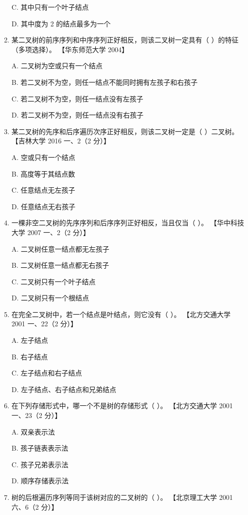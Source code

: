 \documentclass[lang=cn,newtx,10pt,scheme=chinese]{../../elegantbook}
\begin{document}
\begin{enumerate}
    C. 其中只有一个叶子结点  

    D. 其中度为 2 的结点最多为一个  

    \item 某二叉树的前序序列和中序序列正好相反，则该二叉树一定具有（ ）的特征（多项选择）。  
    【华东师范大学 2004】  

    A. 二叉树为空或只有一个结点  

    B. 若二叉树不为空，则任一结点不能同时拥有左孩子和右孩子 

    C. 若二叉树不为空，则任一结点没有左孩子 

    D. 若二叉树不为空，则任一结点没有右孩子  

    \item 某二叉树的先序和后序遍历次序正好相反，则该二叉树一定是（ ）二叉树。  
    【吉林大学 2016 一、2（2 分）】  

    A. 空或只有一个结点  

    B. 高度等于其结点数  

    C. 任意结点无左孩子  

    D. 任意结点无右孩子  

    \item 一棵非空二叉树的先序序列和后序序列正好相反，当且仅当（ ）。  
    【华中科技大学 2007 一、2（2 分）】  

    A. 二叉树任意一结点都无左孩子  

    B. 二叉树任意一结点都无右孩子  

    C. 二叉树只有一个叶子结点  

    D. 二叉树只有一个根结点  

    \item 在完全二叉树中，若一个结点是叶结点，则它没有（ ）。  
    【北方交通大学 2001 一、22（2 分）】  

    A. 左子结点  

    B. 右子结点  

    C. 左子结点和右子结点  

    D. 左子结点、右子结点和兄弟结点  

    \item 在下列存储形式中，哪一个不是树的存储形式（ ）。  
    【北方交通大学 2001 一、23（2 分）】  

    A. 双亲表示法  

    B. 孩子链表表示法  

    C. 孩子兄弟表示法  

    D. 顺序存储表示法  

    \item 树的后根遍历序列等同于该树对应的二叉树的（ ）。  
    【北京理工大学 2001 六、6（2 分）】  


\end{enumerate}
\end{document}
